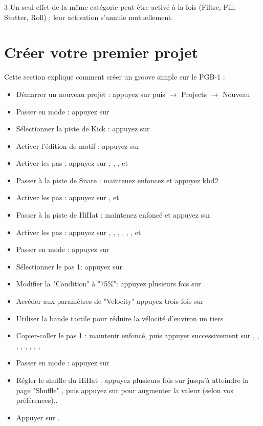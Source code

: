 \documentclass[8pt]{extarticle}
\def\device{PGB-1 }
\begin{document}
\begin{multicols*}{3}
Un seul effet de la même catégorie peut être activé à la fois (Filtre, Fill, Stutter, Roll) ; leur activation s'annule mutuellement.

\section{Créer votre premier projet}

Cette section explique comment créer un groove simple sur le \device:
\begin{itemize}
   \item Démarrer un nouveau projet : appuyez sur  puis $\rightarrow$ Projects $\rightarrow$ Nouveau
   \item Passer en mode  : appuyez sur 
   \item Sélectionner la piste de Kick : appuyez sur 
   \item Activer l'édition de motif : appuyez sur 
   \item Activer les pas : appuyez sur , , , et 
   \item Passer à la piste de Snare : maintenez  enfoncez et appuyez kbd{2}
   \item Activer les pas : appuyez sur , et 
   \item Passer à la piste de HiHat : maintenez  enfoncé et appuyez sur 
   \item Activer les pas : appuyez sur , , , , , , et 
   \item Passer en mode : appuyez sur 
   \item Sélectionner le pas 1: appuyez sur 
   \item Modifier la "Condition" à "75\%": appuyez plusieurs fois sur  
   \item Accéder aux paramètres de "Velocity" appuyez trois fois sur 
   \item Utiliser la bande tactile pour réduire la vélocité d’environ un tiers
   \item Copier-coller le pas 1 : maintenir  enfoncé, puis appuyer successivement sur , , , , , , , , 
   \item Passer en mode : appuyez sur 
   \item Régler le shuffle du HiHat : appuyez plusieurs fois sur  jusqu'à atteindre la page "Shuffle" , puis appuyez sur  pour augmenter la valeur (selon vos préférences)..
   \item Appuyer sur .
\end{itemize}


\end{multicols*}
\end{document}
